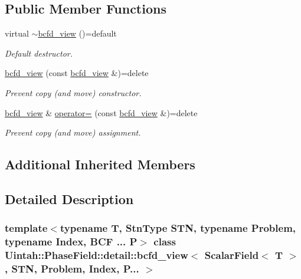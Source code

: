 \subsection*{Public Member Functions}
\begin{DoxyCompactItemize}
\item 
virtual \hyperlink{classUintah_1_1PhaseField_1_1detail_1_1bcfd__view_3_01ScalarField_3_01T_01_4_00_01STN_00_01Problem_00_01Index_00_01P_8_8_8_01_4_abaa29ff6c02f48531b6119eb8e25c2ae}{$\sim$bcfd\+\_\+view} ()=default
\begin{DoxyCompactList}\small\item\em Default destructor. \end{DoxyCompactList}\item 
\hyperlink{classUintah_1_1PhaseField_1_1detail_1_1bcfd__view_3_01ScalarField_3_01T_01_4_00_01STN_00_01Problem_00_01Index_00_01P_8_8_8_01_4_a65dafd15a10a6047cc64abecb4a9a9aa}{bcfd\+\_\+view} (const \hyperlink{classUintah_1_1PhaseField_1_1detail_1_1bcfd__view}{bcfd\+\_\+view} \&)=delete
\begin{DoxyCompactList}\small\item\em Prevent copy (and move) constructor. \end{DoxyCompactList}\item 
\hyperlink{classUintah_1_1PhaseField_1_1detail_1_1bcfd__view}{bcfd\+\_\+view} \& \hyperlink{classUintah_1_1PhaseField_1_1detail_1_1bcfd__view_3_01ScalarField_3_01T_01_4_00_01STN_00_01Problem_00_01Index_00_01P_8_8_8_01_4_a063e364cea3b9c346082797cc244392d}{operator=} (const \hyperlink{classUintah_1_1PhaseField_1_1detail_1_1bcfd__view}{bcfd\+\_\+view} \&)=delete
\begin{DoxyCompactList}\small\item\em Prevent copy (and move) assignment. \end{DoxyCompactList}\end{DoxyCompactItemize}
\subsection*{Additional Inherited Members}


\subsection{Detailed Description}
\subsubsection*{template$<$typename T, Stn\+Type S\+TN, typename Problem, typename Index, B\+C\+F ... P$>$\newline
class Uintah\+::\+Phase\+Field\+::detail\+::bcfd\+\_\+view$<$ Scalar\+Field$<$ T $>$, S\+T\+N, Problem, Index, P... $>$}

